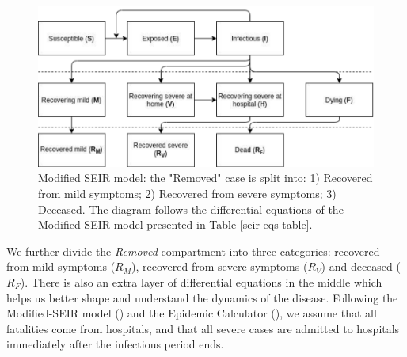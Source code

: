 \documentclass[11pt]{article}
\begin{document}
\begin{figure}[H]
  \centering
  \includegraphics[width=0.9\linewidth]{figs/visual-seir.pdf}
  \caption{Modified SEIR model: the "Removed" case  is split into: 1) Recovered from mild symptoms; 2) Recovered from severe symptoms; 3) Deceased. The diagram follows the differential equations of the Modified-SEIR model presented in Table \ref{seir-eqs-table}.}
  \label{visual-seir}
\end{figure}

We further divide the \textit{Removed} compartment into three categories: recovered from mild symptoms ($R_M$), recovered from severe symptoms ($R_V$) and deceased ($R_F$). There is also an extra layer of differential equations in the middle which helps us better shape and understand the dynamics of the disease. Following the Modified-SEIR model (\cite{chowdhury2020dynamic}) and the Epidemic Calculator (\cite{gabgoh}), we assume that all fatalities come from hospitals, and that all severe cases are admitted to hospitals immediately after the infectious period ends.
\end{document}
